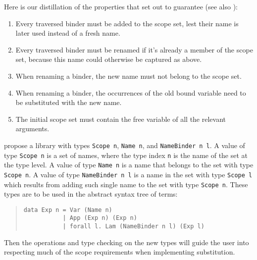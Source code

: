 \documentclass[sigconf, anonymous, review]{acmart}
\newcommand{\tc}[1]{{\small\texttt{#1}}}
\begin{document}
Here is our distillation of the properties that \citeauthor{maclaurin23} set
out to guarantee (see also \cite[Section~4]{maclaurin23}):
\begin{enumerate}
\item Every traversed binder must be added to the scope set, lest their name
      is later used instead of a fresh name.
\item \label{req:always-rename} Every traversed binder must be renamed if it's already a member of the
      scope set, because this name could otherwise be captured as above.
\item When renaming a binder, the new name must not belong to the scope set.
\item When renaming a binder, the occurrences of the old bound variable need
      to be substituted with the new name.
\item The initial scope set must contain the free variable of all the relevant
      arguments.
\end{enumerate}

 propose a library with types \tc{Scope n}, \tc{Name n}, and
\tc{Name\-Binder n l}. A value of type \tc{Scope n} is a set of names, where
the type index \tc{n} is the name of the set at the type level. A value of type \tc{Name n} is a name that
belongs to the set with type \tc{Scope n}. A value of type \tc{NameBinder n l} is
a name in the set with type \tc{Scope l} which results from adding such single
name to the set with type \tc{Scope n}. These types are to be used in
the abstract syntax tree of terms:

\begin{quotation}
\begin{verbatim}
data Exp n = Var (Name n)
           | App (Exp n) (Exp n)
           | forall l. Lam (NameBinder n l) (Exp l)
\end{verbatim}
\end{quotation}

Then the operations and type checking on the new types will guide the user into
respecting much of the scope requirements when implementing substitution.
\end{document}
